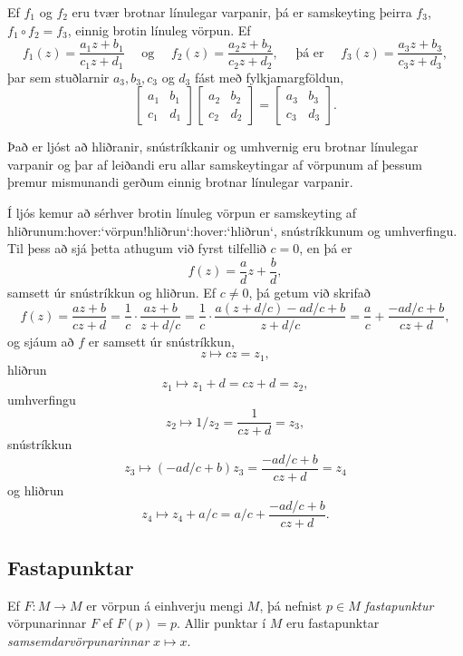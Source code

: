 Ef $f_1$ og $f_2$ eru tvær brotnar línulegar varpanir, þá er 
samskeyting þeirra $f_3$, $f_1\circ f_2=f_3$,
einnig brotin línuleg vörpun.  Ef
$$
f_1(z)=\dfrac{a_1z+b_1}{c_1z+d_1} \quad \text{ og } \quad
f_2(z)=\dfrac{a_2z+b_2}{c_2z+d_2},
\quad \text{ þá er  } \quad 
f_3(z)=\dfrac{a_3z+b_3}{c_3z+d_3},
$$
þar sem stuðlarnir $a_3,b_3,c_3$ og $d_3$ fást með fylkjamargföldun,
$$
\left[\begin{matrix} a_1&b_1\\c_1&d_1\end{matrix}\right]
\left[\begin{matrix} a_2&b_2\\c_2&d_2\end{matrix}\right]
=
\left[\begin{matrix} a_3&b_3\\c_3&d_3\end{matrix}\right].
$$

Það er ljóst að hliðranir, snústríkkanir og umhvernig eru brotnar
línulegar varpanir og þar af leiðandi eru allar samskeytingar af 
vörpunum af þessum þremur mismunandi gerðum einnig brotnar
línulegar varpanir. 

Í ljós kemur að 
  sérhver brotin línuleg vörpun er samskeyting af
hliðrunum:hover:`vörpun!hliðrun`:hover:`hliðrun`, snústríkkunum
og umhverfingu.  Til þess að sjá þetta athugum við fyrst tilfellið
$c=0$, en þá er
 $$f(z)=\frac adz+\frac bd,
 $$
samsett  úr snústríkkun og hliðrun.  Ef $c\neq 0$, þá getum við
skrifað
 $$f(z)= \dfrac{az+b}{cz+d}=\dfrac 1c\cdot \dfrac{az+b}{z+d/c}=
\dfrac 1c\cdot \dfrac{a(z+d/c)-ad/c+b}{z+d/c}=
\dfrac ac+\dfrac{-ad/c+b}{cz+d}, 
 $$
og sjáum að $f$ er samsett  úr snústríkkun, 
$$
z\mapsto cz=z_1,
$$
hliðrun 
$$z_1\mapsto z_1+d=cz+d=z_2,
$$ 
umhverfingu 
$$z_2\mapsto 1/z_2 = \dfrac 1{cz+d}=z_3,
$$
snústríkkun 
$$
z_3\mapsto (-ad/c+b)z_3=\dfrac{-ad/c+b}{cz+d}=z_4
$$ 
og hliðrun
$$
z_4\mapsto z_4+a/c=a/c+\dfrac{-ad/c+b}{cz+d}.
$$


\subsection*{Fastapunktar}

Ef $F:M\to M$ er vörpun á einhverju mengi $M$, þá nefnist 
$p\in M$ {\it fastapunktur} vörpunarinnar $F$ ef $F(p)=p$.
Allir punktar í $M$ eru fastapunktar {\it samsemdarvörpunarinnar}
$x\mapsto x$.

